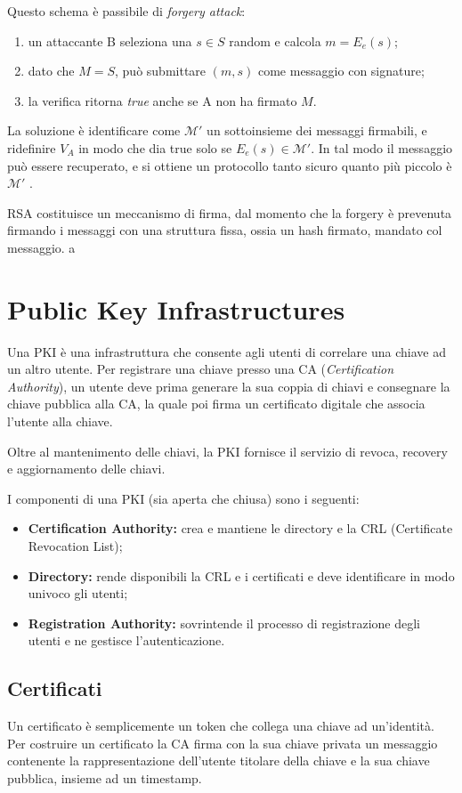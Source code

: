 \documentclass[a4paper, 10pt, twoside]{article}
\begin{document}
	Questo schema è passibile di \textit{forgery attack}:\begin{enumerate}
		\item un attaccante B seleziona una $s \in S$ random e calcola $m = E_e(s)$;
		\item dato che $M=S$, può submittare $(m,s)$ come messaggio con signature;
		\item la verifica ritorna \textit{true} anche se A non ha firmato $M$.
	\end{enumerate}
	
	La soluzione è identificare come $\mathcal{M}'$ un sottoinsieme dei messaggi firmabili, e ridefinire $V_A$ in modo che dia true solo se $E_e(s) \in \mathcal{M}'$. In tal modo il messaggio può essere recuperato, e si ottiene un protocollo tanto sicuro quanto più piccolo è $\mathcal{M}'$ .

	RSA costituisce un meccanismo di firma, dal momento che la forgery è prevenuta firmando i messaggi con una struttura fissa, ossia un hash firmato, mandato col messaggio.
a
	\section{Public Key Infrastructures}
	Una PKI è una infrastruttura che consente agli utenti di correlare una chiave ad un altro utente.
	Per registrare una chiave presso una CA (\textit{Certification Authority}), un utente deve prima generare la sua coppia di chiavi e consegnare la chiave pubblica alla CA, la quale poi firma un certificato digitale che associa l'utente alla chiave.

	Oltre al mantenimento delle chiavi, la PKI fornisce il servizio di revoca, recovery e aggiornamento delle chiavi.

	I componenti di una PKI (sia aperta che chiusa) sono i seguenti: \begin{itemize}
			\item \textbf{Certification Authority:} crea e mantiene le directory e la CRL (Certificate Revocation List);
			\item \textbf{Directory:} rende disponibili la CRL e i certificati e deve identificare in modo univoco gli utenti;
			\item \textbf{Registration Authority:} sovrintende il processo di registrazione degli utenti e ne gestisce l'autenticazione.
	\end{itemize}

    \subsection{Certificati}
    Un certificato è semplicemente un token che collega una chiave ad un'identità. Per costruire un certificato la CA firma con la sua chiave privata un messaggio contenente la rappresentazione dell'utente titolare della chiave e la sua chiave pubblica, insieme ad un timestamp.
\end{document}
